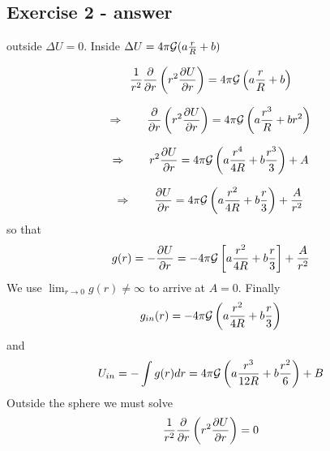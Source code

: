 \subsection*{Exercise 2 - answer}

outside $\Delta U=0$. Inside $\Delta U= 4\pi {\cal G} (a\frac{r}{R}+b)$

\begin{equation}
\frac{1}{r^2} \frac{\partial}{\partial r} \left( r^2 \frac{\partial U}{\partial r} \right) = 4 \pi {\cal G} 
\left( a \frac{r}{R} + b \right) \nonumber
\end{equation}

\begin{equation}
\Rightarrow \qquad
\frac{\partial}{\partial r} \left( r^2 \frac{\partial U}{\partial r} \right) = 4 \pi {\cal G} 
 \left( a \frac{r^3}{R} + b r^2 \right) \nonumber
\end{equation}

\begin{equation}
\Rightarrow \qquad
r^2 \frac{\partial U}{\partial r} = 4 \pi {\cal G} \left(a \frac{r^4}{4R} + b \frac{r^3}{3} \right) + A  \nonumber
\end{equation}

\begin{equation}
\Rightarrow \qquad
\frac{\partial U}{\partial r} 
= 4 \pi {\cal G} \left( a\frac{r^2}{4R} + b \frac{r}{3} \right) + \frac{A}{r^2} \nonumber
\end{equation}
so that 
\begin{equation}
g(r)=-\frac{\partial U}{\partial r} = -4 \pi {\cal G} \left[ a \frac{r^2}{4R} + b \frac{r}{3} \right] + \frac{A}{r^2} \nonumber
\end{equation}
We use $\lim_{r\rightarrow 0} g(r) \neq \infty$ to arrive at $A=0$.
Finally 
\begin{equation}
g_{in}(r)= -4 \pi {\cal G} \left( a \frac{r^2}{4R} + b \frac{r}{3} \right)
\end{equation}
and 
\[
U_{in}= - \int g(r) dr = 4 \pi {\cal G} \left( a \frac{r^3}{12R} + b \frac{r^2}{6} \right) + B
\]
Outside the sphere we must solve
\begin{equation}
\frac{1}{r^2} \frac{\partial}{\partial r} \left( r^2 \frac{\partial U}{\partial r} \right) = 0 \nonumber
\end{equation}

